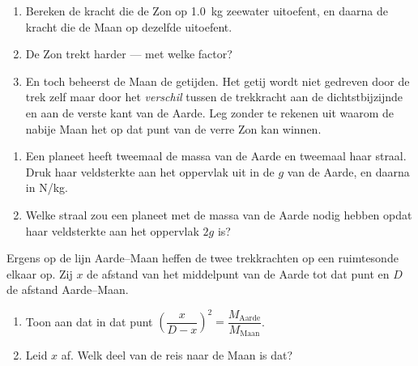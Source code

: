 \begin{exercise}[$\star\star$]\label{exo:g10:universal-gravitation:10}
\begin{enumerate}
  \item Bereken de kracht die de Zon op \qty{1.0}{kg} zeewater
        uitoefent, en daarna de kracht die de Maan op dezelfde 
        uitoefent.
  \item De Zon trekt harder --- met welke factor?
  \item En toch beheerst de Maan de getijden. Het getij wordt niet
        gedreven door de trek zelf maar door het \emph{verschil} tussen
        de trekkracht aan de dichtstbijzijnde en aan de verste kant van
        de Aarde. Leg zonder te rekenen uit waarom de nabije Maan het op
        dat punt van de verre Zon kan winnen.
\end{enumerate}
\end{exercise}

\begin{exercise}[$\star\star$]\label{exo:g10:universal-gravitation:11}
\begin{enumerate}
  \item Een planeet heeft tweemaal de massa van de Aarde en tweemaal
        haar straal. Druk haar veldsterkte aan het oppervlak uit in de
        $g$ van de Aarde, en daarna in \unit{N/kg}.
  \item Welke straal zou een planeet met de massa van de Aarde nodig
        hebben opdat haar veldsterkte aan het oppervlak $2g$ is?
\end{enumerate}
\end{exercise}

\begin{exercise}[$\star\star\star$]\label{exo:g10:universal-gravitation:12}
Ergens op de lijn Aarde--Maan heffen de twee trekkrachten op een
ruimtesonde elkaar op. Zij $x$ de afstand van het middelpunt van de
Aarde tot dat punt en $D$ de afstand Aarde--Maan.
\begin{enumerate}
  \item Toon aan dat in dat punt
        $\left(\dfrac{x}{D - x}\right)^{2}
        = \dfrac{M_{\text{Aarde}}}{M_{\text{Maan}}}$.
  \item Leid $x$ af. Welk deel van de reis naar de Maan is dat?
\end{enumerate}
\end{exercise}

